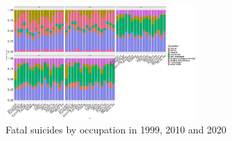 \documentclass{article}
\begin{document}
\begin{figure}[H]
    \centering
    \includegraphics[width=0.65\textwidth]{imgs/job_city_fat_suicides-991020.pdf}
    \caption{Fatal suicides by occupation in 1999, 2010 and 2020}
    \label{fig:job_city_fat_suicides-991020}
\end{figure}
\end{document}
